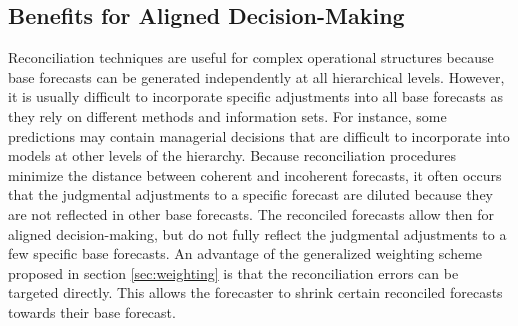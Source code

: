 \documentclass[a4paper,fleqn,11pt]{article}
\begin{document}
\subsection{Benefits for Aligned Decision-Making}\label{sec:resweight}

Reconciliation techniques are useful for complex operational structures because base forecasts can be generated independently at all hierarchical levels. However, it is usually difficult to incorporate specific adjustments into all base forecasts as they rely on different methods and information sets. For instance, some predictions may contain managerial decisions that are difficult to incorporate into models at other levels of the hierarchy. Because reconciliation procedures minimize the distance between coherent and incoherent forecasts, it often occurs that the judgmental adjustments to a specific forecast are diluted because they are not reflected in other base forecasts. The reconciled forecasts allow then for aligned decision-making, but do not fully reflect the judgmental adjustments to a few specific base forecasts. An advantage of the generalized weighting scheme proposed in section \ref{sec:weighting} is that the reconciliation errors can be targeted directly. This allows the forecaster to shrink certain reconciled forecasts towards their base forecast.
\end{document}
